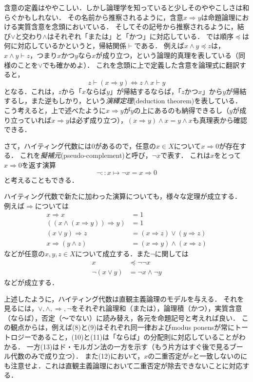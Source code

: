 \documentclass[11pt,a4paper]{jsarticle}
\begin{document}
\begin{example}
含意の定義はややこしい．しかし論理学を知っていると少しそのややこしさは和らぐかもしれない．
その名前から推察されるように，含意$x \Rightarrow y$は命題論理における実質含意を念頭においている．
そしてその記号から推察されるように，結び$\vee$と交わり$\wedge$はそれぞれ「または」と「かつ」に対応している．
では順序$\preceq$は何に対応しているかというと，帰結関係$\vdash$である．
例えば$x \wedge y \preceq z$は，$x \wedge y \vdash z$，つまり$x$かつ$y$なら$x$が成り立つ，という論理的真理を表している（同様のことを$\vee$でも確かめよ）．
これを念頭に上で定義した含意を論理式に翻訳すると，
\[
 z \vdash (x \Rightarrow y) \iff z \wedge x \vdash y
\]
となる．これは，$z$から「$x$ならば$y$」が帰結するならば，「$z$かつ$x$」から$y$が帰結するし，また逆もしかり，という\emph{演繹定理}(deduction theorem)を表している．
こう考えると，上で述べたように$x \Rightarrow y$が$y$の上にあるのも納得できるし（$y$が成り立っていれば$x \Rightarrow y$は必ず成り立つ），$(x \Rightarrow y) \wedge x = y \wedge x$も真理表から確認できる．
\end{example}


さて，ハイティング代数には$0$があるので，任意の$x \in X$について$x \Rightarrow 0$が存在する．
これを\emph{擬補元}(pseudo-complement)と呼び，$\neg x$で表す．
これは$x$をとって$x \Rightarrow 0$を返す演算
\[
 \neg:: x \mapsto \neg x = x \Rightarrow 0
\]
と考えることもできる．

ハイティング代数で新たに加わった演算についても，様々な定理が成立する．
例えば$\Rightarrow$については
\begin{align}
 x \Rightarrow x &= 1 \\
((x \wedge (x \Rightarrow y)) \Rightarrow y) &= 1 \label{eqn:md}\\
(x \vee y ) \Rightarrow z &= (x \Rightarrow z) \vee (y \Rightarrow z) \\
x \Rightarrow (y \wedge z ) &= (x \Rightarrow y) \wedge (x \Rightarrow z) 
\end{align}
などが任意の$x, y, z \in X$について成立する．また$\neg$に関しては
\begin{align}
 x & \preceq \neg \neg x \\
 \neg (x \vee y) &= \neg x \wedge \neg y
\end{align}
などが成立する．

\begin{example}
上述したように，ハイティング代数は直観主義論理のモデルを与える．
それを見るには，$\vee, \wedge, \Rightarrow, \neg$をそれぞれ論理和（または），論理積（かつ），実質含意（ならば），否定（〜でない）に読み替え，各元を命題記号と考えれば良い．
この観点からは，例えば(8)と(9)はそれぞれ同一律およびmodus ponensが常にトートロジーであること，(10)と(11)は「ならば」の分配則に対応していることがわかる．
一方(13)はド・モルガン法の一方を示す（もう片方はすぐ後で見るブール代数のみで成り立つ）．
また(12)において，$x$の二重否定が$x$と一致しないのにも注意せよ．これは直観主義論理において二重否定が除去できないことに対応する．
\end{example}
\end{document}
